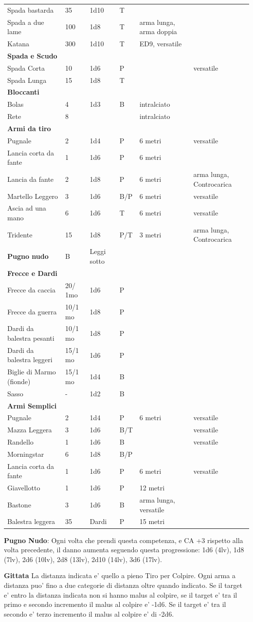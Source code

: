 \documentclass[a4paper,11pt,twoside,openany]{book}
\begin{document}
{\begin{longtable}{|L{3.5cm} |k{1,3cm} |k{1.5cm}| k{1.3cm} |L{4.5cm} |k{3cm}|}
	Spada bastarda & 35 & 1d10 & T & & \tabularnewline
	Spada a due lame & 100 & 1d8 & T & arma lunga, arma doppia & \tabularnewline
	Katana & 300 & 1d10 & T & ED9, versatile & \tabularnewline
	\textbf{Spada e Scudo} & & & & & \tabularnewline
	Spada Corta & 10 & 1d6 & P & & versatile\tabularnewline
	Spada Lunga & 15 & 1d8 & T & & \tabularnewline
	\textbf{Bloccanti} & & & & & \tabularnewline
	Bolas & 4 & 1d3 & B & intralciato & \tabularnewline
	Rete & 8 & & & intralciato & \tabularnewline
	\textbf{Armi da tiro} & & & & & \tabularnewline
	Pugnale & 2 & 1d4 & P & 6 metri & versatile\tabularnewline
	Lancia corta da fante & 1 & 1d6 & P & 6 metri & \tabularnewline
	Lancia da fante & 2 & 1d8 & P & 6 metri &arma lunga, Controcarica\tabularnewline
	Martello Leggero & 3 & 1d6 & B/P & 6 metri & versatile\tabularnewline
	Ascia ad una mano & 6 & 1d6 & T & 6 metri & versatile\tabularnewline
	Tridente & 15 & 1d8 & P/T & 3 metri&arma lunga, Controcarica \tabularnewline
	\textbf{Pugno nudo} & B & Leggi sotto & & & \tabularnewline
	\textbf{Frecce e Dardi} & & & & & \tabularnewline
	Frecce da caccia & 20/ 1mo & 1d6 & P & & \tabularnewline
	Frecce da guerra & 10/1 mo & 1d8 & P & & \tabularnewline
	Dardi da balestra pesanti & 10/1 mo & 1d8 & P & & \tabularnewline
	Dardi da balestra leggeri & 15/1 mo & 1d6 & P & & \tabularnewline
	Biglie di Marmo (fionde) & 15/1 mo & 1d4 & B & & \tabularnewline
	Sasso & - & 1d2 & B & & \tabularnewline
	\textbf{Armi Semplici} & & & & & \tabularnewline
	Pugnale & 2 & 1d4 & P & 6 metri & versatile\tabularnewline
	Mazza Leggera & 3 & 1d6 & B/T & & versatile\tabularnewline
	Randello & 1 & 1d6 & B & & versatile\tabularnewline
	Morningstar & 6 & 1d8 & B/P & & \tabularnewline
	Lancia corta da fante & 1 & 1d6 & P & 6 metri & versatile\tabularnewline
	Giavellotto & 1 & 1d6 & P & 12 metri & \tabularnewline
	Bastone & 3 & 1d6 & B & arma lunga, versatile & \tabularnewline
	Balestra leggera & 35 & Dardi & P & 15 metri & \tabularnewline
\end{longtable}

\textbf{Pugno Nudo}: Ogni volta che prendi questa competenza, e CA +3 rispetto alla volta precedente, il danno aumenta seguendo questa progressione: 1d6 (4lv), 1d8 (7lv), 2d6 (10lv), 2d8 (13lv), 2d10 (14lv), 3d6 (17lv). 

\bigskip

\textbf{Gittata}
La distanza indicata e' quello a pieno Tiro per Colpire. Ogni arma a distanza puo' fino a due categorie di distanza oltre quando indicato. Se il target e' entro la distanza indicata non si hanno malus al colpire, se il target e' tra il primo e secondo incremento il malus al colpire e' -1d6. Se il target e' tra il secondo e' terzo incremento il malus al colpire e' di -2d6.

}
\end{document}
